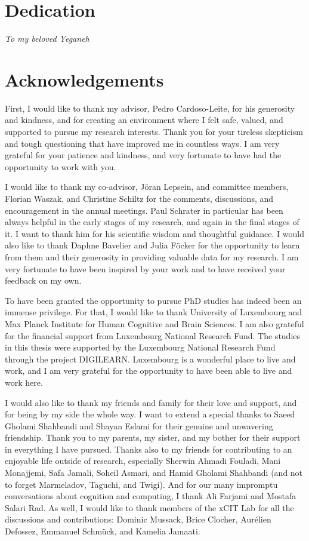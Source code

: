 \section*{Dedication}

\textit{To my beloved Yeganeh}

\newpage

\section*{Acknowledgements}

First, I would like to thank my advisor, Pedro Cardoso-Leite, for his generosity and kindness, and for creating an environment where I felt safe, valued, and supported to pursue my research interests. Thank you for your tireless skepticism and tough questioning that have improved me in countless ways. I am very grateful for your patience and kindness, and very fortunate to have had the opportunity to work with you.

I would like to thank my co-advisor, Jöran Lepsein, and committee members, Florian Waszak, and Christine Schiltz for the comments, discussions, and encouragement in the annual meetings. Paul Schrater in particular has been always helpful in the early stages of my research, and again in the final stages of it. I want to thank him for his scientific wisdom and thoughtful guidance. I would also like to thank Daphne Bavelier and Julia Föcker for the opportunity to learn from them and their generosity in providing valuable data for my research. I am very fortunate to have been inspired by your work and to have received your feedback on my own.

To have been granted the opportunity to pursue PhD studies has indeed been an immense privilege. For that, I would like to thank University of Luxembourg and Max Planck Institute for Human Cognitive and Brain Sciences. I am also grateful for the financial support from Luxembourg National Research Fund. The studies in this thesis were supported by the Luxembourg National Research Fund through the project DIGILEARN. Luxembourg is a wonderful place to live and work, and I am very grateful for the opportunity to have been able to live and work here.

I would also like to thank my friends and family for their love and support, and for being by my side the whole way. I want to extend a special thanks to Saeed Gholami Shahbandi and Shayan Eslami for their genuine and unwavering friendship. Thank you to my parents, my sister, and my bother for their support in everything I have pursued. Thanks also to my friends for contributing to an enjoyable life outside of research, especially Sherwin Ahmadi Fouladi, Mani Monajjemi, Safa Jamali, Soheil Asmari, and Hamid Gholami Shahbandi (and not to forget Marmeladov, Taguchi, and Twigi). And for our many impromptu conversations about cognition and computing, I thank Ali Farjami and Mostafa Salari Rad. As well, I would like to thank members of the xCIT Lab for all the discussions and contributions: Dominic Mussack, Brice Clocher, Aurélien Defossez, Emmanuel Schmück, and Kamelia Jamaati.

